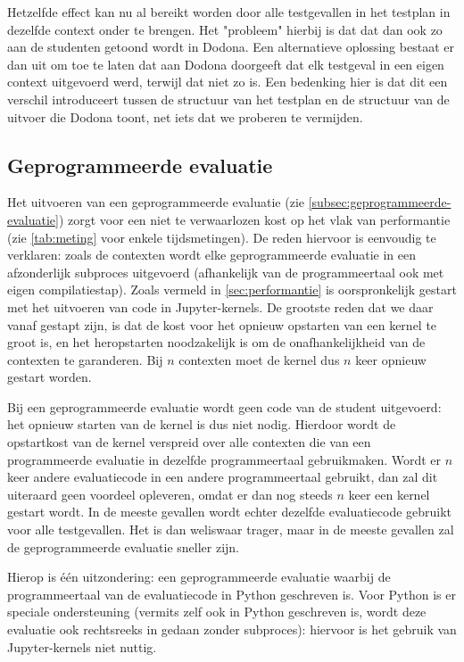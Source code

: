Hetzelfde effect kan nu al bereikt worden door alle testgevallen in het testplan in dezelfde context onder te brengen.
Het "probleem" hierbij is dat dat dan ook zo aan de studenten getoond wordt in Dodona.
Een alternatieve oplossing bestaat er dan uit om toe te laten dat \tested{} aan Dodona doorgeeft dat elk testgeval in een eigen context uitgevoerd werd, terwijl dat niet zo is.
Een bedenking hier is dat dit een verschil introduceert tussen de structuur van het testplan en de structuur van de uitvoer die Dodona toont, net iets dat we proberen te vermijden.

\subsection{Geprogrammeerde evaluatie}\label{subsec:geprogrammeerde-evaluatie-is-traag}

Het uitvoeren van een geprogrammeerde evaluatie (zie \cref{subsec:geprogrammeerde-evaluatie}) zorgt voor een niet te verwaarlozen kost op het vlak van performantie (zie \cref{tab:meting} voor enkele tijdsmetingen).
De reden hiervoor is eenvoudig te verklaren: zoals de contexten wordt elke geprogrammeerde evaluatie in een afzonderlijk subproces uitgevoerd (afhankelijk van de programmeertaal ook met eigen compilatiestap).
Zoals vermeld in \cref{sec:performantie} is \tested{} oorspronkelijk gestart met het uitvoeren van code in Jupyter-kernels.
De grootste reden dat we daar vanaf gestapt zijn, is dat de kost voor het opnieuw opstarten van een kernel te groot is, en het heropstarten noodzakelijk is om de onafhankelijkheid van de contexten te garanderen.
Bij $n$ contexten moet de kernel dus $n$ keer opnieuw gestart worden.

Bij een geprogrammeerde evaluatie wordt geen code van de student uitgevoerd: het opnieuw starten van de kernel is dus niet nodig.
Hierdoor wordt de opstartkost van de kernel verspreid over alle contexten die van een programmeerde evaluatie in dezelfde programmeertaal gebruikmaken.
Wordt er $n$ keer andere evaluatiecode in een andere programmeertaal gebruikt, dan zal dit uiteraard geen voordeel opleveren, omdat er dan nog steeds $n$ keer een kernel gestart wordt.
In de meeste gevallen wordt echter dezelfde evaluatiecode gebruikt voor alle testgevallen.
Het  is dan weliswaar trager, maar in de meeste gevallen zal de geprogrammeerde evaluatie sneller zijn.

Hierop is één uitzondering: een geprogrammeerde evaluatie waarbij de programmeertaal van de evaluatiecode in Python geschreven is.
Voor Python is er speciale ondersteuning (vermits \tested{} zelf ook in Python geschreven is, wordt deze evaluatie ook rechtsreeks in \tested{} gedaan zonder subproces): hiervoor is het gebruik van Jupyter-kernels niet nuttig.

